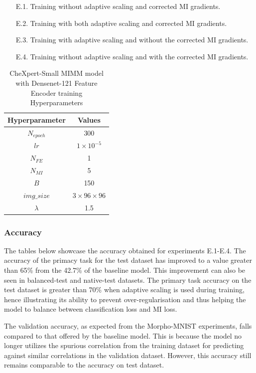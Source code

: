 \documentclass[12pt,DIV14,BCOR12mm,a4paper,footinclude=false,headinclude,parskip=half-,twoside,openright,cleardoublepage=empty,toc=index,bibliography=totoc,listof=totoc]{scrreprt}
\numberwithin{equation}{chapter}
\begin{document}
\begin{itemize}
    \item [E.1.] Training without adaptive scaling and corrected MI gradients.
    \item [E.2.] Training with both adaptive scaling and corrected MI gradients.    
    \item [E.3.] Training with adaptive scaling and without the corrected MI gradients.
    \item [E.4.] Training without adaptive scaling and with the corrected MI gradients.
\end{itemize}

\begin{table}[H]
\centering
\begin{tabular}{|C|C|}
\hline
\textbf{Hyperparameter} & \textbf{Values} \\
\hline
$N_{epoch}$ & 300 \\
$lr$ & $1\times10^{-5}$\\
$N_{FE}$ & 1\\
$N_{MI}$ & 5 \\
$B$ & 150 \\
$img\_size$& $3\times96\times96$\\
$\lambda$ & 1.5  \\
\hline
\end{tabular}
\caption{CheXpert-Small MIMM model with Densenet-121 Feature Encoder training Hyperparameters}
\label{tab:chx_dense_MIMM_HP}
\end{table}

\subsubsection{Accuracy}
The tables below showcase the accuracy obtained for experiments E.1-E.4. The accuracy of the primacy task for the test dataset has improved to a value greater than 65\% from the 42.7\% of the baseline model. This improvement can also be seen in balanced-test and native-test datasets. The primary task accuracy on the test dataset is greater than 70\% when adaptive scaling is used during training, hence illustrating its ability to prevent over-regularisation and thus helping the model to balance between classification loss and MI loss. 

The validation accuracy, as expected from the Morpho-MNIST experiments, falls compared to that offered by the baseline model. This is because the model no longer utilizes the spurious correlation from the training dataset for predicting against similar correlations in the validation dataset. However, this accuracy still remains comparable to the accuracy on test dataset.
\end{document}
